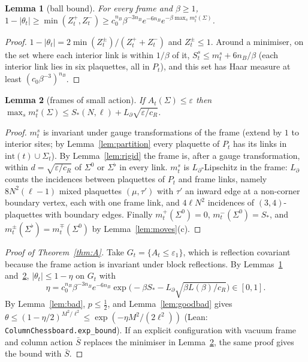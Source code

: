 \documentclass[11pt,a4paper]{article}
\newtheorem{lemma}{Lemma}[section]
\theoremstyle{definition}
\theoremstyle{remark}
\newcommand{\code}[1]{\texttt{#1}}
\begin{document}
\begin{lemma}[ball bound]\label{lem:ball}
For every frame and $\beta\ge1$, $1-|\theta_t|\ge\min(Z^+_t,Z^-_t)\ge c_0^{n_B}\beta^{-3n_B}e^{-6n_B}e^{-\beta\max_sm^s_t(\Sigma)}$.
\end{lemma}
\begin{proof}
$1-|\theta_t|=2\min(Z^\pm_t)/(Z^+_t+Z^-_t)$ and $Z^\pm_t\le1$.
Around a minimiser, on the set where each interior link is within $1/\beta$ of it, $S^s_t\le m^s_t+6n_B/\beta$ (each interior link lies in six plaquettes, all in $P_t$), and this set has Haar measure at least $(c_0\beta^{-3})^{n_B}$.
\end{proof}

\begin{lemma}[frames of small action]\label{lem:good}
If $A_t(\Sigma)\le\varepsilon$ then $\max_sm^s_t(\Sigma)\le S_*(N,\ell)+L_\partial\sqrt{\varepsilon/c_R}$.
\end{lemma}
\begin{proof}
$m^s_t$ is invariant under gauge transformations of the frame (extend by $1$ to interior sites; by Lemma~\ref{lem:partition} every plaquette of $P_t$ has its links in $\mathrm{int}(t)\cup\Sigma_t$).
By Lemma~\ref{lem:rigid} the frame is, after a gauge transformation, within $d=\sqrt{\varepsilon/c_R}$ of $\Sigma^0$ or $\Sigma^\flat$ in every link.
$m^s_t$ is $L_\partial$-Lipschitz in the frame: $L_\partial$ counts the incidences between plaquettes of $P_t$ and frame links, namely $8N^2(\ell-1)$ mixed plaquettes $(\mu,\tau')$ with $\tau'$ an inward edge at a non-corner boundary vertex, each with one frame link, and $4\ell N^2$ incidences of $(3,4)$-plaquettes with boundary edges.
Finally $m^+_t(\Sigma^0)=0$, $m^-_t(\Sigma^0)=S_*$, and $m^\pm_t(\Sigma^\flat)=m^\mp_t(\Sigma^0)$ by Lemma~\ref{lem:moves}(c).
\end{proof}

\begin{proof}[Proof of Theorem~\ref{thm:A}]
Take $G_t=\{A_t\le\varepsilon_1\}$, which is reflection covariant because the frame action is invariant under block reflections. By Lemmas~\ref{lem:ball} and~\ref{lem:good}, $|\theta_t|\le1-\eta$ on $G_t$ with
\[ \eta=c_0^{n_B}\beta^{-3n_B}e^{-6n_B}\exp\big(-\beta S_*-L_\partial\sqrt{\beta L(\beta)/c_R}\big)\in[0,1]. \]
By Lemma~\ref{lem:bad}, $p\le\frac12$, and Lemma~\ref{lem:goodbad} gives $\theta\le(1-\eta/2)^{M^2/\ell^2}\le\exp(-\eta M^2/(2\ell^2))$ (Lean: \code{ColumnChessboard.exp\_bound}). If an explicit configuration with vacuum frame and column action $\bar S$ replaces the minimiser in Lemma~\ref{lem:good}, the same proof gives the bound with $\bar S$.
\end{proof}
\end{document}
